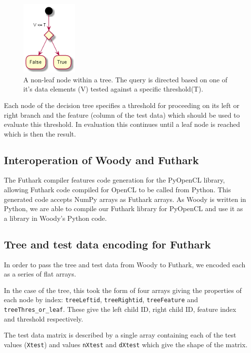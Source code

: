 \documentclass[a4paper]{article}
\begin{document}
\begin{figure}
\centering
\includegraphics[width=0.25\textwidth]{decision_node}
\caption{\label{fig:frog1}A non-leaf node within a tree. The query is directed based on one of it's data elements (V) tested against a specific threshold(T).}
\end{figure}

Each node of the decision tree specifies a threshold for proceeding on its left or right branch and the feature (column of the test data) which should be used to evaluate this threshold. In evaluation this continues until a leaf node is reached which is then the result.

\subsection{Interoperation of Woody and Futhark}

The Futhark compiler features code generation for the PyOpenCL library, allowing Futhark code compiled for OpenCL to be called from Python. This generated code accepts NumPy arrays as Futhark arrays. As Woody is written in Python, we are able to compile our Futhark library for PyOpenCL and use it as a library in Woody's Python code.

\subsection{Tree and test data encoding for Futhark}

In order to pass the tree and test data from Woody to Futhark, we encoded each as a series of flat arrays.

In the case of the tree, this took the form of four arrays giving the properties of each node by index: \texttt{treeLeftid}, \texttt{treeRightid}, \texttt{treeFeature} and \texttt{treeThres\_or\_leaf}. These give the left child ID, right child ID, feature index and threshold respectively.

The test data matrix is described by a single array containing each of the test values (\texttt{Xtest}) and values \texttt{nXtest} and \texttt{dXtest} which give the shape of the matrix.
\end{document}
